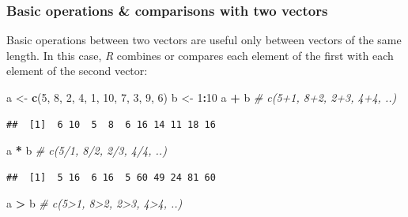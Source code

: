 \documentclass[
]{scrartcl}
\newenvironment{Shaded}{\begin{snugshade}}{\end{snugshade}}
\newcommand{\CommentTok}[1]{\textcolor[rgb]{0.56,0.35,0.01}{\textit{#1}}}
\newcommand{\DecValTok}[1]{\textcolor[rgb]{0.00,0.00,0.81}{#1}}
\newcommand{\KeywordTok}[1]{\textcolor[rgb]{0.13,0.29,0.53}{\textbf{#1}}}
\newcommand{\NormalTok}[1]{#1}
\newcommand{\OperatorTok}[1]{\textcolor[rgb]{0.81,0.36,0.00}{\textbf{#1}}}
\newcommand{\StringTok}[1]{\textcolor[rgb]{0.31,0.60,0.02}{#1}}
\begin{document}
\hypertarget{basic-operations-comparisons-with-two-vectors}{%
\subsubsection{Basic operations \& comparisons with two vectors}\label{basic-operations-comparisons-with-two-vectors}}

Basic operations between two vectors are useful only between vectors of the same length. In this case, \emph{R} combines or compares each element of the first with each element of the second vector:

\begin{Shaded}
\begin{Highlighting}[]
\NormalTok{a \textless{}{-}}\StringTok{ }\KeywordTok{c}\NormalTok{(}\DecValTok{5}\NormalTok{, }\DecValTok{8}\NormalTok{, }\DecValTok{2}\NormalTok{, }\DecValTok{4}\NormalTok{, }\DecValTok{1}\NormalTok{, }\DecValTok{10}\NormalTok{, }\DecValTok{7}\NormalTok{, }\DecValTok{3}\NormalTok{, }\DecValTok{9}\NormalTok{, }\DecValTok{6}\NormalTok{)}
\NormalTok{b \textless{}{-}}\StringTok{ }\DecValTok{1}\OperatorTok{:}\DecValTok{10}
\NormalTok{a }\OperatorTok{+}\StringTok{ }\NormalTok{b    }\CommentTok{\# c(5+1, 8+2, 2+3, 4+4, ..)}
\end{Highlighting}
\end{Shaded}

\begin{verbatim}
##  [1]  6 10  5  8  6 16 14 11 18 16
\end{verbatim}

\begin{Shaded}
\begin{Highlighting}[]
\NormalTok{a }\OperatorTok{*}\StringTok{ }\NormalTok{b    }\CommentTok{\# c(5/1, 8/2, 2/3, 4/4, ..)}
\end{Highlighting}
\end{Shaded}

\begin{verbatim}
##  [1]  5 16  6 16  5 60 49 24 81 60
\end{verbatim}

\begin{Shaded}
\begin{Highlighting}[]
\NormalTok{a }\OperatorTok{\textgreater{}}\StringTok{ }\NormalTok{b    }\CommentTok{\# c(5\textgreater{}1, 8\textgreater{}2, 2\textgreater{}3, 4\textgreater{}4, ..)}
\end{Highlighting}
\end{Shaded}
\end{document}
